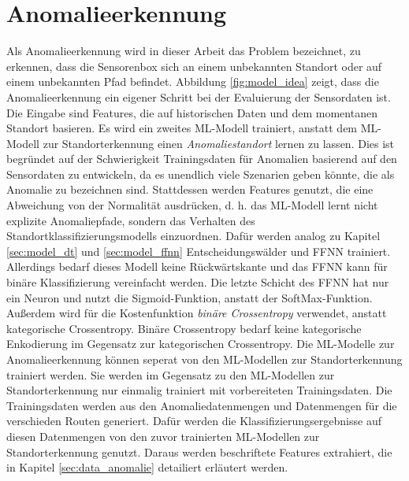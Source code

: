 \section{Anomalieerkennung}
Als Anomalieerkennung wird in dieser Arbeit das Problem bezeichnet, zu erkennen, dass die Sensorenbox sich an einem
unbekannten Standort oder auf einem unbekannten Pfad befindet.
Abbildung \ref{fig:model_idea} zeigt, dass die Anomalieerkennung ein eigener Schritt bei der Evaluierung der Sensordaten ist.
Die Eingabe sind Features, die auf historischen Daten und dem momentanen Standort basieren.
\newline
\newline
Es wird ein zweites ML-Modell trainiert, anstatt dem ML-Modell zur Standorterkennung einen \textit{Anomaliestandort} lernen zu lassen.
Dies ist begründet auf der Schwierigkeit Trainingsdaten für Anomalien basierend auf den Sensordaten zu entwickeln,
da es unendlich viele Szenarien geben könnte, die als Anomalie zu bezeichnen sind.
Stattdessen werden Features genutzt, die eine Abweichung von der Normalität ausdrücken,
d. h. das ML-Modell lernt nicht explizite Anomaliepfade, sondern das Verhalten des Standortklassifizierungsmodells einzuordnen.
\newline
\newline
Dafür werden analog zu Kapitel \ref{sec:model_dt} und \ref{sec:model_ffnn} Entscheidungswälder und FFNN trainiert.
Allerdings bedarf dieses Modell keine Rückwärtskante und das FFNN kann für binäre Klassifizierung vereinfacht werden.
Die letzte Schicht des FFNN hat nur ein Neuron und nutzt die Sigmoid-Funktion, anstatt der SoftMax-Funktion.
Außerdem wird für die Kostenfunktion \textit{binäre Crossentropy} verwendet, anstatt kategorische Crossentropy.
Binäre Crossentropy bedarf keine kategorische Enkodierung im Gegensatz zur kategorischen Crossentropy.
\newline
\newline
Die ML-Modelle zur Anomalieerkennung können seperat von den ML-Modellen zur Standorterkennung trainiert werden.
Sie werden im Gegensatz zu den ML-Modellen zur Standorterkennung nur einmalig trainiert mit vorbereiteten Trainingsdaten.
Die Trainingsdaten werden aus den Anomaliedatenmengen und Datenmengen für die verschieden Routen generiert.
Dafür werden die Klassifizierungsergebnisse auf diesen Datenmengen von den zuvor trainierten ML-Modellen zur Standorterkennung genutzt.
Daraus werden beschriftete Features extrahiert, die in Kapitel \ref{sec:data_anomalie} detailiert erläutert werden.